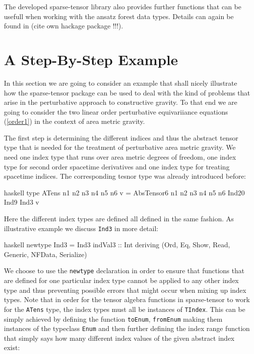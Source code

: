 \documentclass[a4paper,12pt, DIV=14, BCOR=5mm, twoside, headsepline]{scrbook}
\begin{document}
The developed sparse-tensor library also provides further functions that can be usefull when working with the ansatz forest data types. Details can again be found in (cite own hackage package !!!).

\section{A Step-By-Step Example}
In this section we are going to consider an example that shall nicely illustrate how the sparse-tensor package can be used to deal with the kind of problems that arise in the perturbative approach to constructive gravity. To that end we are going to consider the two linear order perturbative equivariiance equations (\ref{order1}) in the context of area metric gravity. 

The first step is determining the different indices and thus the abstract tensor type that is needed for the treatment of perturbative area metric gravity. 
We need one index type that runs over area metric degrees of freedom, one index type for second order spacetime derivatives and one index type for treating spacetime indices. The corresponding tesnor type was already introduced before:

\begin{center}
\begin{cminted}{haskell}
type ATens n1 n2 n3 n4 n5 n6 v = 
     AbsTensor6 n1 n2 n3 n4 n5 n6 Ind20 Ind9 Ind3 v
\end{cminted}
\end{center}

Here the different index types are defined all defined in the same fashion. As illustrative example we discuss \texttt{Ind3} in more detail:

\begin{center}
\begin{cminted}{haskell}
newtype Ind3 =  Ind3 {indVal3 :: Int}
    deriving (Ord, Eq, Show, Read, Generic, NFData, Serialize)
\end{cminted}
\end{center}

We choose to use the \texttt{newtype} declaration in order to ensure that functions that are defined for one particular index type cannot be applied to any other index type and thus preventing possible errors that might occur when mixing up index types.
Note that in order for the tensor algebra functions in sparse-tensor to work for the \texttt{ATens} type, the index types must all be instances of \texttt{TIndex}. This can be simply achieved by defining the function \texttt{toEnum}, \texttt{fromEnum} making them instances of the typeclass \texttt{Enum} and then further defining the index range function that simply says how many different index values of the given abstract index exist:
\end{document}

